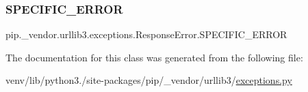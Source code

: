 \subsubsection{\texorpdfstring{S\+P\+E\+C\+I\+F\+I\+C\+\_\+\+E\+R\+R\+OR}{SPECIFIC\_ERROR}}
{\footnotesize\ttfamily pip.\+\_\+vendor.\+urllib3.\+exceptions.\+Response\+Error.\+S\+P\+E\+C\+I\+F\+I\+C\+\_\+\+E\+R\+R\+OR\hspace{0.3cm}{\ttfamily [static]}}



The documentation for this class was generated from the following file\+:\begin{DoxyCompactItemize}
\item 
venv/lib/python3./site-\/packages/pip/\+\_\+vendor/urllib3/\hyperlink{pip_2__vendor_2urllib3_2exceptions_8py}{exceptions.\+py}\end{DoxyCompactItemize}
